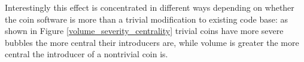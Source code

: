Interestingly this effect is concentrated in different ways depending on whether the coin software is more than a trivial modification to existing code base: as shown in Figure \ref{volume_severity_centrality} trivial coins have more severe bubbles the more central their introducers are, while volume is greater the more central the introducer of a nontrivial coin is.

